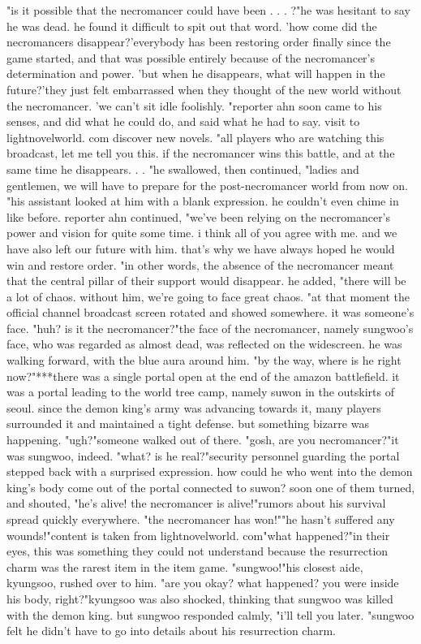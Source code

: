 "is it possible that the necromancer could have been .
.
.
?"he was hesitant to say he was dead.
 he found it difficult to spit out that word.
 'how come did the necromancers disappear?'everybody has been restoring order finally since the game started, and that was possible entirely because of the necromancer's determination and power.
 'but when he disappears, what will happen in the future?'they just felt embarrassed when they thought of the new world without the necromancer.
'we can't sit idle foolishly.
"reporter ahn soon came to his senses, and did what he could do, and said what he had to say.
visit to lightnov‌elworld.
com discover new novels.
"all players who are watching this broadcast, let me tell you this.
 if the necromancer wins this battle, and at the same time he disappears.
.
.
"he swallowed, then continued, "ladies and gentlemen, we will have to prepare for the post-necromancer world from now on.
"his assistant looked at him with a blank expression.
 he couldn't even chime in like before.
reporter ahn continued, "we've been relying on the necromancer's power and vision for quite some time.
 i think all of you agree with me.
 and we have also left our future with him.
 that's why we have always hoped he would win and restore order.
"in other words, the absence of the necromancer meant that the central pillar of their support would disappear.
he added, "there will be a lot of chaos.
 without him, we're going to face great chaos.
"at that moment the official channel broadcast screen rotated and showed somewhere.
it was someone's face.
"huh? is it the necromancer?"the face of the necromancer, namely sungwoo's face, who was regarded as almost dead, was reflected on the widescreen.
he was walking forward, with the blue aura around him.
 "by the way, where is he right now?"***there was a single portal open at the end of the amazon battlefield.
 it was a portal leading to the world tree camp, namely suwon in the outskirts of seoul.
 since the demon king's army was advancing towards it, many players surrounded it and maintained a tight defense.
but something bizarre was happening.
"ugh?"someone walked out of there.
"gosh, are you necromancer?"it was sungwoo, indeed.
 "what? is he real?"security personnel guarding the portal stepped back with a surprised expression.
 how could he who went into the demon king's body come out of the portal connected to suwon? soon one of them turned, and shouted, "he's alive! the necromancer is alive!"rumors about his survival spread quickly everywhere.
"the necromancer has won!""he hasn't suffered any wounds!"content is taken from lightnovelworld.
com"what happened?"in their eyes, this was something they could not understand because the resurrection charm was the rarest item in the item game.
"sungwoo!"his closest aide, kyungsoo, rushed over to him.
"are you okay? what happened? you were inside his body, right?"kyungsoo was also shocked, thinking that sungwoo was killed with the demon king.
but sungwoo responded calmly, "i'll tell you later.
"sungwoo felt he didn't have to go into details about his resurrection charm.


